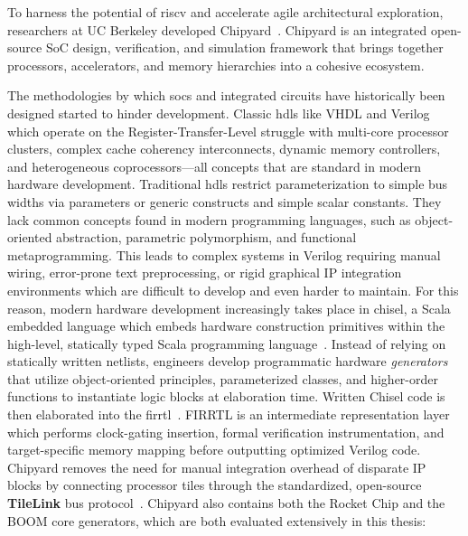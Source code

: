 To harness the potential of \gls{riscv} and accelerate agile architectural exploration, researchers at UC Berkeley developed Chipyard~\cite{amid2020chipyard}.
Chipyard is an integrated open-source SoC design, verification, and simulation framework that brings together processors, accelerators, and memory hierarchies into a cohesive ecosystem.

The methodologies by which \glspl{soc} and integrated circuits have historically been designed started to hinder development. 
Classic \glspl{hdl} like VHDL and Verilog which operate on the Register-Transfer-Level struggle with multi-core processor clusters, complex cache coherency interconnects, dynamic memory controllers, 
and heterogeneous coprocessors---all concepts that are standard in modern hardware development.
Traditional \glspl{hdl} restrict parameterization to simple bus widths via parameters or generic constructs and simple scalar constants.
They lack common concepts found in modern programming languages, such as object-oriented abstraction, parametric polymorphism, and functional metaprogramming.
This leads to complex systems in Verilog requiring manual wiring, error-prone text preprocessing, 
or rigid graphical IP integration environments which are difficult to develop and even harder to maintain.
For this reason, modern hardware development increasingly takes place in \gls{chisel},
a Scala embedded language which embeds hardware construction primitives within the high-level, statically typed Scala programming language~\cite{bachrach2012chisel}.
Instead of relying on statically written netlists, engineers develop programmatic hardware \emph{generators} 
that utilize object-oriented principles, parameterized classes, and higher-order functions to instantiate logic blocks at elaboration time.
Written Chisel code is then elaborated into the \gls{firrtl}~\cite{amid2020chipyard}.
FIRRTL is an intermediate representation layer which performs clock-gating insertion,
formal verification instrumentation, and target-specific memory mapping before outputting optimized Verilog code.
Chipyard removes the need for manual integration overhead of disparate IP blocks by connecting processor tiles through the standardized, open-source \textbf{TileLink} bus protocol~\cite{cook2017tilelink}.
Chipyard also contains both the Rocket Chip and the BOOM core generators, which are both evaluated extensively in this thesis:

